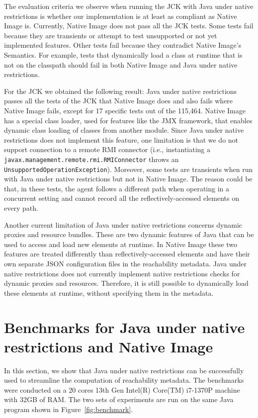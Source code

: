 The evaluation criteria we observe when running the JCK with Java under native restrictions is whether our implementation is at least as compliant as Native Image is. Currently, Native Image does not pass all the JCK tests. Some tests fail because they are transients or attempt to test unsupported or not yet implemented features. Other tests fail because they contradict Native Image's Semantics. For example, tests that dynamically load a class at runtime that is not on the classpath should fail in both Native Image and Java under native restrictions. 

For the JCK we obtained the following result: Java under native restrictions passes all the tests of the JCK that Native Image does and also fails where Native Image fails, except for 17 specific tests out of the 115,464. Native Image has a special class loader, used for features like the JMX framework, that enables dynamic class loading of classes from another module. 
Since Java under native restrictions does not implement this feature, one limitation is that we do not support connection to a remote RMI connector (i.e., instantiating a \verb|javax.management.remote.rmi.RMIConnector| throws an \verb|UnsupportedOperationException|). 
Moreover, some tests are transients when run with Java under native restrictions but not in Native Image. The reason could be that, in these tests, the agent follows a different path when operating in a concurrent setting and cannot record all the reflectively-accessed elements on every path. 

Another current limitation of Java under native restrictions concerns dynamic proxies and resource bundles. These are two dynamic features of Java that can be used to access and load new elements at runtime. In Native Image these two features are treated differently than reflectively-accessed elements and have their own separate JSON configuration files in the reachability metadata. Java under native restrictions does not currently implement native restrictions checks for dynamic proxies and resources. Therefore, it is still possible to dynamically load these elements at runtime, without specifying them in the metadata. 

\section{Benchmarks for Java under native restrictions and Native Image}\label{benchmark}
In this section, we show that Java under native restrictions can be successfully used to streamline the computation of reachability metadata. The benchmarks were conducted on a 20 cores 13th Gen Intel(R) Core(TM) i7-1370P machine with 32GB of RAM. The two sets of experiments are run on the same Java program shown in Figure~\ref{fig:benchmark}. 

